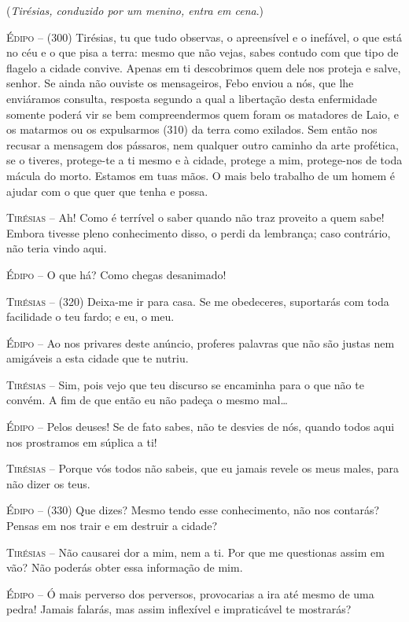 (\emph{Tirésias, conduzido por um menino, entra em cena}.)

\textsc{Édipo} --   (300) Tirésias, tu que tudo observas, o apreensível e o inefável, o que
está no céu e o que pisa a terra: mesmo que não vejas, sabes contudo com
que tipo de flagelo a cidade convive. Apenas em ti descobrimos quem dele
nos proteja e salve, senhor. Se ainda não ouviste os mensageiros, Febo
enviou a nós, que lhe enviáramos consulta, resposta segundo a qual a
libertação desta enfermidade somente poderá vir se bem compreendermos
quem foram os matadores de Laio, e os matarmos ou os expulsarmos (310)
da terra como exilados. Sem então nos recusar a mensagem dos pássaros,
nem qualquer outro caminho da arte profética, se o tiveres, protege-te a
ti mesmo e à cidade, protege a mim, protege-nos de toda mácula do morto.
Estamos em tuas mãos. O mais belo trabalho de um homem é ajudar com o
que quer que tenha e possa.

\textsc{Tirésias} --   Ah! Como é terrível o saber quando não traz proveito a quem sabe! Embora
tivesse pleno conhecimento disso, o perdi da lembrança; caso contrário,
não teria vindo aqui.

\textsc{Édipo} --   O que há? Como chegas desanimado!

\textsc{Tirésias} --   (320) Deixa-me ir para casa. Se me obedeceres, suportarás com toda
facilidade o teu fardo; e eu, o meu.

\textsc{Édipo} --   Ao nos privares deste anúncio, proferes palavras que não são justas nem
amigáveis a esta cidade que te nutriu.

\textsc{Tirésias} --   Sim, pois vejo que teu discurso se encaminha para o que não te convém. A
fim de que então eu não padeça o mesmo mal\ldots{}

\textsc{Édipo} --   Pelos deuses! Se de fato sabes, não te desvies de nós, quando todos aqui
nos prostramos em súplica a ti!

\textsc{Tirésias} --   Porque vós todos não sabeis, que eu jamais revele os meus males, para
não dizer os teus.

\textsc{Édipo} --   (330) Que dizes? Mesmo tendo esse conhecimento, não nos contarás? Pensas
em nos trair e em destruir a cidade?

\textsc{Tirésias} --   Não causarei dor a mim, nem a ti. Por que me questionas assim em vão?
Não poderás obter essa informação de mim.

\textsc{Édipo} --   Ó mais perverso dos perversos, provocarias a ira até mesmo de uma pedra!
Jamais falarás, mas assim inflexível e impraticável te mostrarás?

